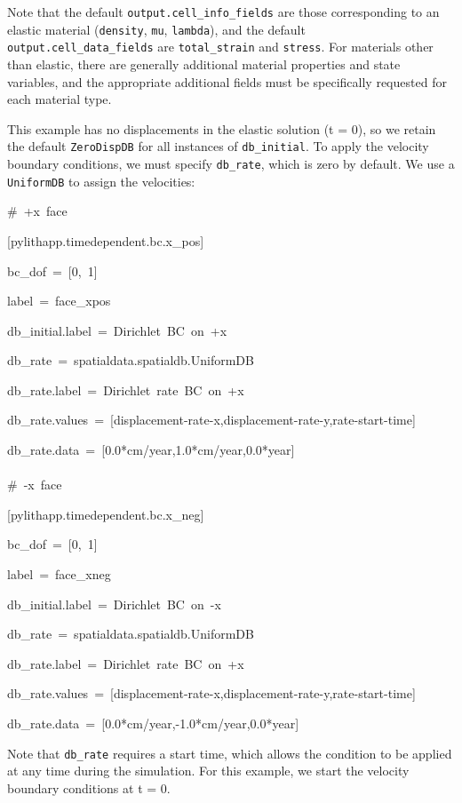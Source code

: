 Note that the default \texttt{output.cell\_info\_fields} are those
corresponding to an elastic material (\texttt{density}, \texttt{mu},
\texttt{lambda}), and the default \texttt{output.cell\_data\_fields}
are \texttt{total\_strain} and \texttt{stress}. For materials other
than elastic, there are generally additional material properties and
state variables, and the appropriate additional fields must be specifically
requested for each material type.

This example has no displacements in the elastic solution (t = 0),
so we retain the default \texttt{ZeroDispDB} for all instances of
\texttt{db\_initial}. To apply the velocity boundary conditions, we
must specify \texttt{db\_rate}, which is zero by default. We use a
\texttt{UniformDB} to assign the velocities:
\begin{lyxcode}
\#~+x~face

{[}pylithapp.timedependent.bc.x\_pos{]}

bc\_dof~=~{[}0,~1{]}

label~=~face\_xpos

db\_initial.label~=~Dirichlet~BC~on~+x

db\_rate~=~spatialdata.spatialdb.UniformDB

db\_rate.label~=~Dirichlet~rate~BC~on~+x

db\_rate.values~=~{[}displacement-rate-x,displacement-rate-y,rate-start-time{]}

db\_rate.data~=~{[}0.0{*}cm/year,1.0{*}cm/year,0.0{*}year{]}~\\
~\\


\#~-x~face

{[}pylithapp.timedependent.bc.x\_neg{]}

bc\_dof~=~{[}0,~1{]}

label~=~face\_xneg

db\_initial.label~=~Dirichlet~BC~on~-x

db\_rate~=~spatialdata.spatialdb.UniformDB

db\_rate.label~=~Dirichlet~rate~BC~on~+x

db\_rate.values~=~{[}displacement-rate-x,displacement-rate-y,rate-start-time{]}

db\_rate.data~=~{[}0.0{*}cm/year,-1.0{*}cm/year,0.0{*}year{]}
\end{lyxcode}
Note that \texttt{db\_rate} requires a start time, which allows the
condition to be applied at any time during the simulation. For this
example, we start the velocity boundary conditions at t = 0.

